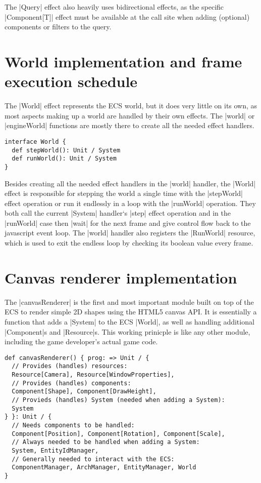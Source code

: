 The |Query| effect also heavily uses bidirectional effects, as the specific |Component[T]| effect must be available at the call site when adding (optional) components or filters to the query.

\section{World implementation and frame execution schedule}

The |World| effect represents the ECS world, but it does very little on its own, as most aspects making up a world are handled by their own effects. The |world| or |engineWorld| functions are mostly there to create all the needed effect handlers.

\begin{lstlisting}[caption=World signiture]
interface World {
  def stepWorld(): Unit / System
  def runWorld(): Unit / System
}
\end{lstlisting}

Besides creating all the needed effect handlers in the |world| handler, the |World| effect is responsible for stepping the world a single time with the |stepWorld| effect operation or run it endlessly in a loop with the |runWorld| operation. They both call the current |System| handler`s |step| effect operation and in the |runWorld| case then |wait| for the next frame and give control flow back to the javascript event loop. The |world| handler also registers the |RunWorld| resource, which is used to exit the endless loop by checking its boolean value every frame.

\section{Canvas renderer implementation}

The |canvasRenderer| is the first and most important module built on top of the ECS to render simple 2D shapes using the HTML5 canvas API. It is essentially a function that adds a |System| to the ECS |World|, as well as handling additional |Component|s and |Resource|s. This working prinicple is like any other module, including the game developer's actual game code.

\begin{lstlisting}[caption=canvasRenderer signiture]
def canvasRenderer() { prog: => Unit / {
  // Provides (handles) resources:
  Resource[Camera], Resource[WindowProperties],
  // Provides (handles) components:
  Component[Shape], Component[DrawHeight],
  // Provieds (handles) System (needed when adding a System):
  System
} }: Unit / {
  // Needs components to be handled:
  Component[Position], Component[Rotation], Component[Scale],
  // Always needed to be handled when adding a System:
  System, EntityIdManager,
  // Generally needed to interact with the ECS:
  ComponentManager, ArchManager, EntityManager, World
}
\end{lstlisting}

